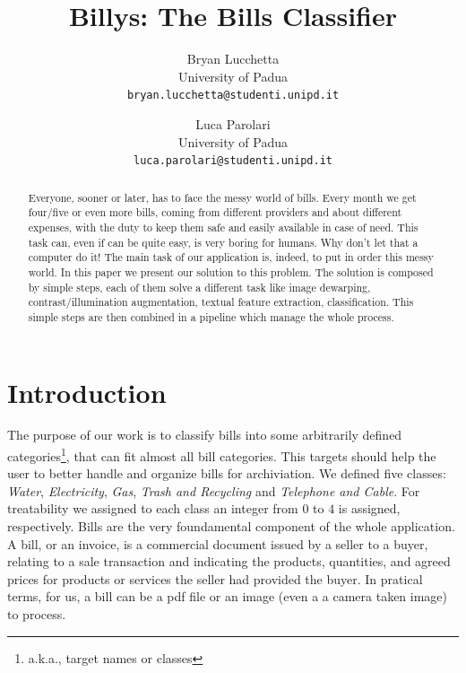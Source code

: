 \documentclass[10pt,twocolumn,letterpaper]{article}
\begin{document}
\title{Billys: The Bills Classifier}

\author{Bryan Lucchetta\\
{\small University of Padua}\\
{\tt\small bryan.lucchetta@studenti.unipd.it}
\and
Luca Parolari\\
{\small University of Padua}\\
{\tt\small luca.parolari@studenti.unipd.it}
}

\maketitle


\begin{abstract}
Everyone, sooner or later, has to face the messy world of bills. Every
month we get four/five or even more bills, coming from different
providers and about different expenses, with the duty to keep them
safe and easily available in case of need. This task can, even if can
be quite easy, is very boring for humans. Why don't let that a
computer do it! The main task of our application is, indeed, to put in
order this messy world.  In this paper we present our solution to this
problem. The solution is composed by simple steps, each of them solve
a different task like image dewarping, contrast/illumination
augmentation, textual feature extraction, classification. This simple
steps are then combined in a pipeline which manage the whole process.
\end{abstract}


\section{Introduction}

The purpose of our work is to classify bills into some arbitrarily
defined categories\footnote{a.k.a., target names or classes}, that can
fit almost all bill categories. This targets should help the user to
better handle and organize bills for archiviation. We defined five
classes: \emph{Water}, \emph{Electricity}, \emph{Gas}, \emph{Trash and
  Recycling} and \emph{Telephone and Cable}. For treatability we
assigned to each class an integer from $0$ to $4$ is assigned,
respectively. Bills are the very foundamental component of the whole
application. A bill, or an invoice, is a commercial document issued by
a seller to a buyer, relating to a sale transaction and indicating the
products, quantities, and agreed prices for products or services the
seller had provided the buyer. In pratical terms, for us, a bill can
be a pdf file or an image (even a a camera taken image) to process.
\end{document}
